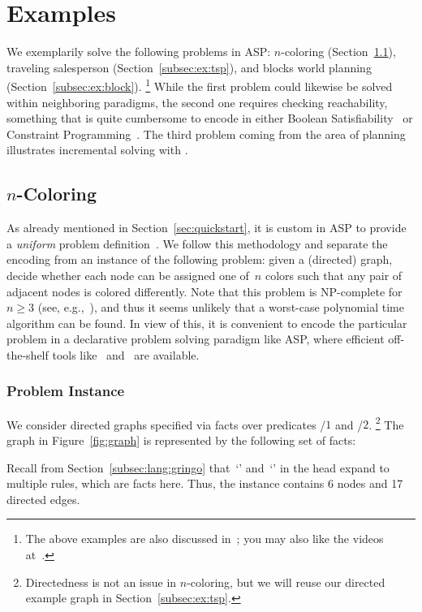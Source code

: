 \section{Examples}\label{sec:examples}

We exemplarily solve the following problems in ASP:
$n$-coloring (Section~\ref{subsec:ex:color}),
traveling salesperson (Section~\ref{subsec:ex:tsp}), and
blocks world planning (Section~\ref{subsec:ex:block}).%
\footnote{The above examples are also discussed in~\cite{gekakasc12a};
  you may also like the videos at~\cite{potassco}.}
While the first problem could likewise be solved within neighboring paradigms,
the second one requires checking reachability,
something that is quite cumbersome to encode in either
Boolean Satisfiability~\cite{SATHandbook} or
Constraint Programming~\cite{CPHandbook}.
The third problem coming from the area of planning
illustrates incremental solving with \clingo.

\subsection{\texorpdfstring{$n$}{n}-Coloring}\label{subsec:ex:color}

As already mentioned in Section~\ref{sec:quickstart},
it is custom in ASP to provide a \emph{uniform}
problem definition~\cite{martru99a,niemela99a,schlipf95a}.
We follow this methodology and separate the encoding
from an instance of the following problem:
given a (directed) graph, decide whether each node can be assigned
one of~$n$ colors such that any pair of adjacent nodes is colored differently.
Note that this problem is NP-complete for~$n\geq 3$
(see, e.g.,~\cite{papadimitriou94a}),
and thus it seems unlikely that a worst-case polynomial time algorithm
can be found.
In view of this,
it is convenient to encode the particular problem in a declarative problem solving paradigm like ASP,
where efficient off-the-shelf tools like \gringo\ and \clasp\ are available.

\subsubsection{Problem Instance}\label{subsec:color:instance}

We consider directed graphs specified via facts over predicates
/$1$ and /$2$.%
\footnote{%
  Directedness is not an issue in $n$-coloring,
  but we will reuse our directed example graph in Section~\ref{subsec:ex:tsp}.}
The graph in Figure~\ref{fig:graph} is represented by the following set of facts:
%

%
Recall from Section~\ref{subsec:lang:gringo} that~`' and~`\code{;}'
in the head expand to multiple rules, which are facts here.
Thus, the instance contains 6 nodes and 17 directed edges.
%


